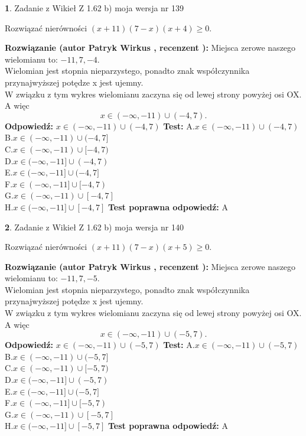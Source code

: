 \documentclass[12pt, a4paper]{article}
\theoremstyle{definition} %
\newtheorem{zad}{}
\newcommand{\zadStart}[1]{\begin{zad}#1\newline}
\newcommand{\zadStop}{\end{zad}}
\newcommand{\rozwStart}[2]{\noindent \textbf{Rozwiązanie (autor #1 , recenzent #2): }\newline}
\newcommand{\rozwStop}{\newline}
\newcommand{\odpStart}{\noindent \textbf{Odpowiedź:}\newline}
\newcommand{\odpStop}{\newline}
\newcommand{\testStart}{\noindent \textbf{Test:}\newline}
\newcommand{\testStop}{\newline}
\newcommand{\kluczStart}{\noindent \textbf{Test poprawna odpowiedź:}\newline}
\newcommand{\kluczStop}{\newline}
\begin{document}
\zadStart{Zadanie z Wikieł Z 1.62 b) moja wersja nr 139}

Rozwiązać nierówności $(x+11)(7-x)(x+4)\ge0$.
\zadStop
\rozwStart{Patryk Wirkus}{}
Miejsca zerowe naszego wielomianu to: $-11, 7, -4$.\\
Wielomian jest stopnia nieparzystego, ponadto znak współczynnika przy\linebreak najwyższej potędze x jest ujemny.\\ W związku z tym wykres wielomianu zaczyna się od lewej strony powyżej osi OX. A więc $$x \in (-\infty,-11) \cup (-4,7).$$
\rozwStop
\odpStart
$x \in (-\infty,-11) \cup (-4,7)$
\odpStop
\testStart
A.$x \in (-\infty,-11) \cup (-4,7)$\\
B.$x \in (-\infty,-11) \cup (-4,7]$\\
C.$x \in (-\infty,-11) \cup [-4,7)$\\
D.$x \in (-\infty,-11] \cup (-4,7)$\\
E.$x \in (-\infty,-11] \cup (-4,7]$\\
F.$x \in (-\infty,-11] \cup [-4,7)$\\
G.$x \in (-\infty,-11) \cup [-4,7]$\\
H.$x \in (-\infty,-11] \cup [-4,7]$
\testStop
\kluczStart
A
\kluczStop



\zadStart{Zadanie z Wikieł Z 1.62 b) moja wersja nr 140}

Rozwiązać nierówności $(x+11)(7-x)(x+5)\ge0$.
\zadStop
\rozwStart{Patryk Wirkus}{}
Miejsca zerowe naszego wielomianu to: $-11, 7, -5$.\\
Wielomian jest stopnia nieparzystego, ponadto znak współczynnika przy\linebreak najwyższej potędze x jest ujemny.\\ W związku z tym wykres wielomianu zaczyna się od lewej strony powyżej osi OX. A więc $$x \in (-\infty,-11) \cup (-5,7).$$
\rozwStop
\odpStart
$x \in (-\infty,-11) \cup (-5,7)$
\odpStop
\testStart
A.$x \in (-\infty,-11) \cup (-5,7)$\\
B.$x \in (-\infty,-11) \cup (-5,7]$\\
C.$x \in (-\infty,-11) \cup [-5,7)$\\
D.$x \in (-\infty,-11] \cup (-5,7)$\\
E.$x \in (-\infty,-11] \cup (-5,7]$\\
F.$x \in (-\infty,-11] \cup [-5,7)$\\
G.$x \in (-\infty,-11) \cup [-5,7]$\\
H.$x \in (-\infty,-11] \cup [-5,7]$
\testStop
\kluczStart
A
\kluczStop
\end{document}
